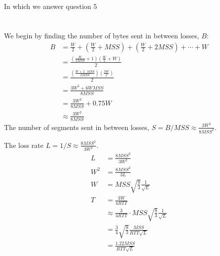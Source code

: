 \documentclass[10pt,a4paper]{article}
\begin{document}
\section{}
In which we answer question 5
\section{}
We begin by finding the number of bytes sent in between losses, $B$:
\begin{align*}
    B&=\frac{W}{2} + \left(\frac{W}{2} + MSS\right) + \left(\frac{W}{2} + 2MSS\right) + \cdots + W \\
     &=\frac{\left(\frac{W}{2MSS}+1\right)\left(\frac{W}{2}+W\right)}{2} \\
     &=\frac{\left(\frac{W+2\cdot MSS}{2MSS}\right)\left(\frac{3W}{2}\right)}{2} \\
     &=\frac{3W^2+6WMSS}{8MSS} \\
     &=\frac{3W^2}{8MSS} + 0.75 W \\
     &\approx \frac{3W^2}{8MSS}
\end{align*}
The number of segments sent in between losses, $S=B/MSS\approx\displaystyle\frac{3W^2}{8MSS^2}$.

The loss rate $L=1/S\approx\displaystyle\frac{8MSS^2}{3W^2}$.
\begin{align*}
    L&=\frac{8MSS^2}{3W^2} \\
    W^2&=\frac{8MSS^2}{3L} \\
    W&=MSS\sqrt{\frac{8}{3}}\frac{1}{\sqrt{L}} \\
    T&=\frac{3W}{4RTT} \\
    &\approx\frac{3}{4RTT}\cdot MSS\sqrt{\frac{8}{3}}\frac{1}{\sqrt{L}} \\
    &=\frac{3}{4}\sqrt{\frac{8}{3}}\frac{MSS}{RTT\sqrt{L}} \\
    &=\frac{1.22MSS}{RTT\sqrt{L}}
\end{align*}
\end{document}

